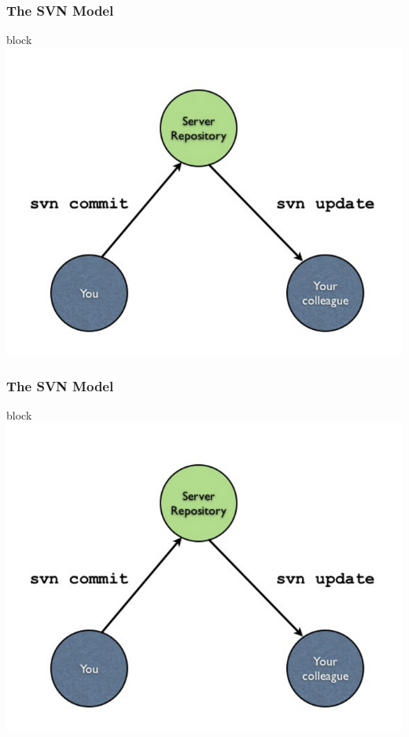 \begin{frame}
	\frametitle{The SVN Model}
	\begin{block}{block}
		\includegraphics[width=\textwidth]{./images/svnmodel.png}
	\end{block}
\end{frame}
\begin{frame}
	\frametitle{The SVN Model}
	\begin{block}{block}
		\includegraphics[width=\textwidth]{./images/svnmodel.png}
	\end{block}
\end{frame}
